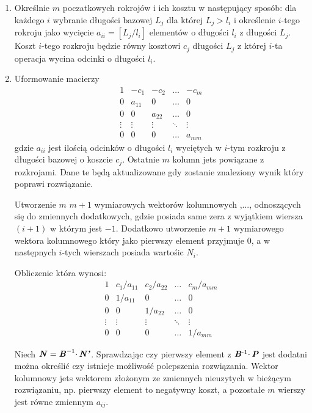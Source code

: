 \begin{enumerate}
\item Określnie $m$ poczatkowych rokrojów i ich kosztu w następujący sposób: dla każdego $i$ wybranie długości bazowej $L_j$ dla której $L_j > l_i$ i określenie $i$-tego rokroju jako wycięcie $a_{ii} = [L_j / l_i]$ elementów o długości $l_i$ z długości $L_j$. Koszt $i$-tego rozkroju będzie równy kosztowi $c_j$ długości $L_j$ z której $i$-ta operacja wycina odcinki o długości $l_i$.
\item Uformowanie macierzy 
\[
\begin{matrix}
1 & -c_1  & -c_2  & \dots & -c_m \\
0 & a_{11}  & 0 & \dots & 0 \\
0 & 0 & a_{22}  & \dots & 0 \\
\vdots&\vdots&\vdots&\ddots&\vdots \\
0 & 0 & 0 & \dots & a_{mm}
\end{matrix}
\]
gdzie $a_{ii}$ jest ilością odcinków o długości $l_i$ wyciętych w $i$-tym rozkroju z długości bazowej o koszcie $c_j$. Ostatnie $m$ kolumn jets powiązane z rozkrojami. Dane te będą aktualizowane gdy zostanie znaleziony wynik który poprawi rozwiązanie.

Utworzenie $m$ $m+1$ wymiarowych wektorów kolumnowych ,..., odnoszących się do zmiennych dodatkowych, gdzie  posiada same zera z wyjątkiem wiersza $(i+1)$ w którym jest $-1$. Dodatkowo utworzenie $m+1$ wymiarowego wektora kolumnowego  który jako pierwszy element przyjmuje 0, a w następnych $i$-tych wierszach posiada wartośic $N_i$.

Obliczenie  która wynosi:
\[
\begin{matrix}
1 & c_1/a_{11}  & c_2/a_{22}  & \dots & c_m/a_{mm} \\
0 & 1/a_{11}  & 0 & \dots & 0 \\
0 & 0 & 1/a_{22}  & \dots & 0 \\
\vdots&\vdots&\vdots&\ddots&\vdots \\
0 & 0 & 0 & \dots & 1/a_{mm}
\end{matrix}
\]

Niech $\textbf{\textit{N}} = \textbf{\textit{B}}^{-1} \cdotp \textbf{\textit{N'}}$. Sprawdzając czy pierwszy element z $\textbf{\textit{B}}\textsuperscript{-1} \cdotp \textbf{\textit{P}}$ jest dodatni można określić czy istnieje możliwość polepszenia rozwiązania. Wektor kolumnowy  jets wektorem złożonym ze zmiennych nieuzytych w bieżącym rozwiązaniu, np. pierwszy element to negatywny koszt, a pozostałe $m$ wierszy jest równe zmiennym $a_{ij}$.


\end{enumerate}
